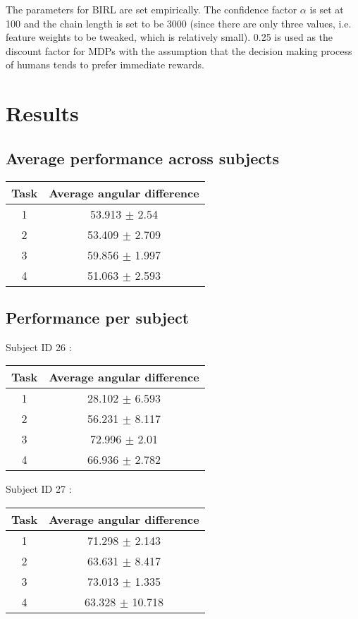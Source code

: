 \documentclass[12pt]{article}
\begin{document}
The parameters for BIRL are set empirically. The confidence factor $\alpha$ is set at 100 and the chain length is set to be 3000 (since there are only three values, i.e. feature weights to be tweaked, which is relatively small). 0.25 is used as the discount factor for MDPs with the assumption that the decision making process of humans tends to prefer immediate rewards. \par


\section{Results}
\subsection{Average performance across subjects}
\begin{center}
\begin{tabular}{|c|c|}
\hline
 Task & Average angular difference \\ \hline
1  &  53.913 $\pm$ 2.54 \\
2  &  53.409 $\pm$ 2.709 \\
3  &  59.856 $\pm$ 1.997 \\
4  &  51.063 $\pm$ 2.593 \\
\hline
\end{tabular}
\end{center}
\par

\subsection{Performance per subject}
Subject ID  26 :
\begin{center}
\begin{tabular}{|c|c|}
\hline
 Task & Average angular difference \\ \hline
1  &  28.102 $\pm$ 6.593 \\
2  &  56.231 $\pm$ 8.117 \\
3  &  72.996 $\pm$ 2.01 \\
4  &  66.936 $\pm$ 2.782 \\
\hline
\end{tabular}
\end{center}

\par Subject ID  27 :
\begin{center}
\begin{tabular}{|c|c|}
\hline
 Task & Average angular difference \\ \hline
1  &  71.298 $\pm$ 2.143 \\
2  &  63.631 $\pm$ 8.417 \\
3  &  73.013 $\pm$ 1.335 \\
4  &  63.328 $\pm$ 10.718 \\
\hline
\end{tabular}
\end{center}
\end{document}
